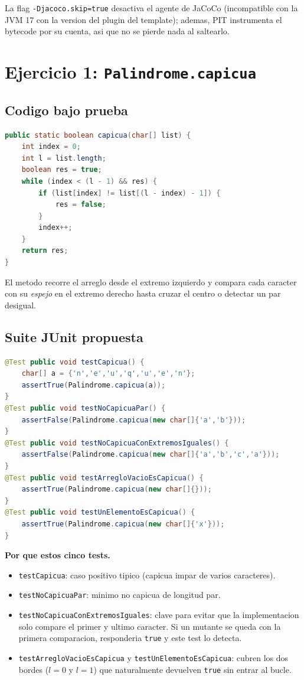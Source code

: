 \documentclass[12pt,a4paper]{article}
\begin{document}
La flag \texttt{-Djacoco.skip=true} desactiva el agente de JaCoCo (incompatible con la JVM 17
con la version del plugin del template); ademas, PIT instrumenta el bytecode por su cuenta, asi
que no se pierde nada al saltearlo.

\section{Ejercicio 1: \texttt{Palindrome.capicua}}

\subsection{Codigo bajo prueba}

\begin{lstlisting}[style=codestyle,language=Java]
public static boolean capicua(char[] list) {
    int index = 0;
    int l = list.length;
    boolean res = true;
    while (index < (l - 1) && res) {
        if (list[index] != list[(l - index) - 1]) {
            res = false;
        }
        index++;
    }
    return res;
}
\end{lstlisting}

El metodo recorre el arreglo desde el extremo izquierdo y compara cada caracter con su
\emph{espejo} en el extremo derecho hasta cruzar el centro o detectar un par desigual.

\subsection{Suite JUnit propuesta}

\begin{lstlisting}[style=codestyle,language=Java]
@Test public void testCapicua() {
    char[] a = {'n','e','u','q','u','e','n'};
    assertTrue(Palindrome.capicua(a));
}
@Test public void testNoCapicuaPar() {
    assertFalse(Palindrome.capicua(new char[]{'a','b'}));
}
@Test public void testNoCapicuaConExtremosIguales() {
    assertFalse(Palindrome.capicua(new char[]{'a','b','c','a'}));
}
@Test public void testArregloVacioEsCapicua() {
    assertTrue(Palindrome.capicua(new char[]{}));
}
@Test public void testUnElementoEsCapicua() {
    assertTrue(Palindrome.capicua(new char[]{'x'}));
}
\end{lstlisting}

\textbf{Por que estos cinco tests.}

\begin{itemize}
  \item \texttt{testCapicua}: caso positivo tipico (capicua impar de varios caracteres).
  \item \texttt{testNoCapicuaPar}: minimo no capicua de longitud par.
  \item \texttt{testNoCapicuaConExtremosIguales}: clave para evitar que la implementacion solo
  compare el primer y ultimo caracter. Si un mutante se queda con la primera comparacion,
  responderia \texttt{true} y este test lo detecta.
  \item \texttt{testArregloVacioEsCapicua} y \texttt{testUnElementoEsCapicua}: cubren los dos
  bordes ($l = 0$ y $l = 1$) que naturalmente devuelven \texttt{true} sin entrar al bucle.
\end{itemize}
\end{document}
